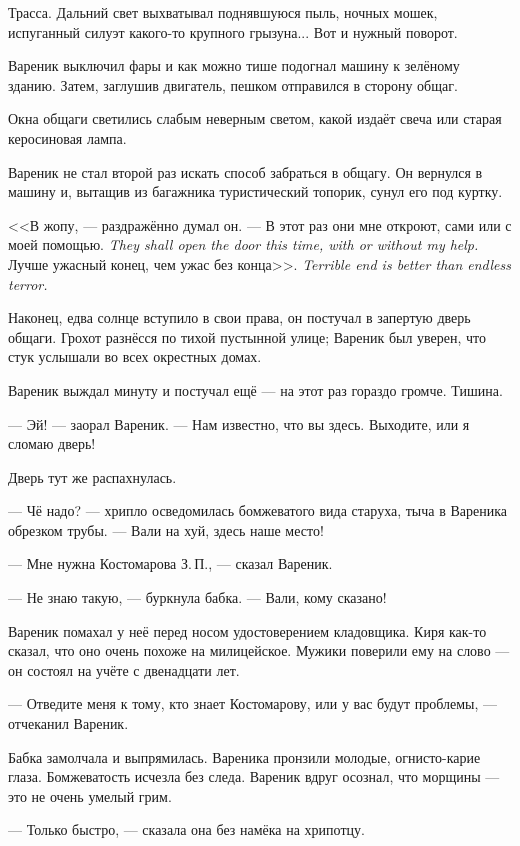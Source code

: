 Трасса.
Дальний свет выхватывал поднявшуюся пыль, ночных мошек, испуганный силуэт какого-то крупного грызуна...
Вот и нужный поворот.

Вареник выключил фары и как можно тише подогнал машину к зелёному зданию.
Затем, заглушив двигатель, пешком отправился в сторону общаг.

Окна общаги светились слабым неверным светом, какой издаёт свеча или старая керосиновая лампа.

Вареник не стал второй раз искать способ забраться в общагу.
Он вернулся в машину и, вытащив из багажника туристический топорик, сунул его под куртку.

<<В жопу, --- раздражённо думал он.
{--- В этот раз они мне откроют, сами или с моей помощью.}
{\textit{They shall open the door this time, with or without my help.}}
{Лучше ужасный конец, чем ужас без конца>>.}
{\textit{Terrible end is better than endless terror.}}

Наконец, едва солнце вступило в свои права, он постучал в запертую дверь общаги.
Грохот разнёсся по тихой пустынной улице;
Вареник был уверен, что стук услышали во всех окрестных домах.

Вареник выждал минуту и постучал ещё --- на этот раз гораздо громче.
Тишина.

--- Эй! --- заорал Вареник.
--- Нам известно, что вы здесь.
Выходите, или я сломаю дверь!

Дверь тут же распахнулась.

--- Чё надо? --- хрипло осведомилась бомжеватого вида старуха, тыча в Вареника обрезком трубы.
--- Вали на хуй, здесь наше место!

--- Мне нужна Костомарова З.\,П., --- сказал Вареник.

--- Не знаю такую, --- буркнула бабка.
--- Вали, кому сказано!

Вареник помахал у неё перед носом удостоверением кладовщика.
Киря как-то сказал, что оно очень похоже на милицейское.
Мужики поверили ему на слово --- он состоял на учёте с двенадцати лет.

--- Отведите меня к тому, кто знает Костомарову, или у вас будут проблемы, --- отчеканил Вареник.

Бабка замолчала и выпрямилась.
Вареника пронзили молодые, огнисто-карие глаза.
Бомжеватость исчезла без следа.
Вареник вдруг осознал, что морщины --- это не очень умелый грим.

--- Только быстро, --- сказала она без намёка на хрипотцу.

